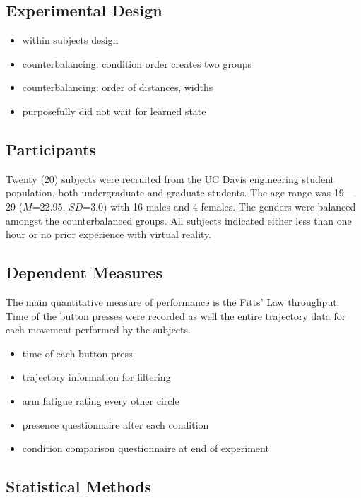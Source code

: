 \subsection{Experimental Design}

\begin{itemize}
  \item within subjects design
  \item counterbalancing: condition order creates two groups
  \item counterbalancing: order of distances, widths
  \item purposefully did not wait for learned state
\end{itemize}

\subsection{Participants}

Twenty (20) subjects were recruited from the UC Davis engineering student population, both undergraduate and graduate students.
The age range was 19---29 ($M$=22.95, $SD$=3.0) with 16 males and 4 females.
The genders were balanced amongst the counterbalanced groups.
All subjects indicated either less than one hour or no prior experience with virtual reality.

\subsection{Dependent Measures}

The main quantitative measure of performance is the Fitts' Law throughput.
Time of the button presses were recorded as well the entire trajectory data for each movement performed by the subjects.

\begin{itemize}
  \item time of each button press
  \item trajectory information for filtering
  \item arm fatigue rating every other circle
  \item presence questionnaire after each condition
  \item condition comparison questionnaire at end of experiment
\end{itemize}

\subsection{Statistical Methods}

